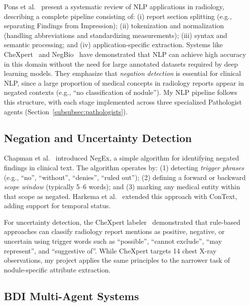 \documentclass[12pt]{article}
\begin{document}
Pons et al.~\cite{pons2016nlpradiology} present a systematic review of NLP applications in radiology, describing a complete pipeline consisting of: (i) report section splitting (e.g., separating Findings from Impression); (ii) tokenization and normalization (handling abbreviations and standardizing measurements); (iii) syntax and semantic processing; and (iv) application-specific extraction. Systems like CheXpert~\cite{irvin2019chexpert} and NegBio~\cite{peng2018negbio} have demonstrated that NLP can achieve high accuracy in this domain without the need for large annotated datasets required by deep learning models. They emphasize that \emph{negation detection} is essential for clinical NLP, since a large proportion of medical concepts in radiology reports appear in negated contexts (e.g., ``no classification of nodule''). My NLP pipeline follows this structure, with each stage implemented across three specialized Pathologist agents (Section~\ref{subsubsec:pathologists}).

\subsection{Negation and Uncertainty Detection}
\label{subsec:negation}

Chapman et al.~\cite{chapman2001negex} introduced NegEx, a simple algorithm for identifying negated findings in clinical text. The algorithm operates by: (1) detecting \emph{trigger phrases} (e.g., ``no'', ``without'', ``denies'', ``ruled out''); (2) defining a forward or backward \emph{scope window} (typically 5--6 words); and (3) marking any medical entity within that scope as negated. Harkema et al.~\cite{harkema2009context} extended this approach with ConText, adding support for temporal status.

For uncertainty detection, the CheXpert labeler~\cite{irvin2019chexpert} demonstrated that rule-based approaches can classify radiology report mentions as positive, negative, or uncertain using trigger words such as ``possible'', ``cannot exclude'', ``may represent'', and ``suggestive of''. While CheXpert targets 14 chest X-ray observations, my project applies the same principles to the narrower task of nodule-specific attribute extraction.

\subsection{BDI Multi-Agent Systems}
\label{subsec:bdi}
\end{document}
